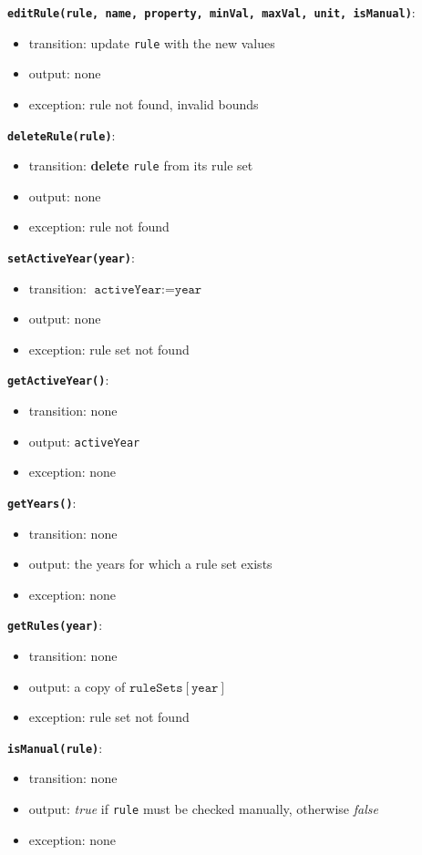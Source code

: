 \documentclass[12pt, titlepage]{article}
\begin{document}
\textbf{\texttt{editRule(rule, name, property, minVal, maxVal, unit, isManual)}}:
\begin{itemize}
  \item transition: update \texttt{rule} with the new values
  \item output: none
  \item exception: rule not found, invalid bounds
\end{itemize}

\textbf{\texttt{deleteRule(rule)}}:
\begin{itemize}
  \item transition: \textbf{delete} \texttt{rule} from its rule set
  \item output: none
  \item exception: rule not found
\end{itemize}

\textbf{\texttt{setActiveYear(year)}}:
\begin{itemize}
  \item transition: $\texttt{activeYear} := \texttt{year}$
  \item output: none
  \item exception: rule set not found
\end{itemize}

\textbf{\texttt{getActiveYear()}}:
\begin{itemize}
  \item transition: none
  \item output: \texttt{activeYear}
  \item exception: none
\end{itemize}

\textbf{\texttt{getYears()}}:
\begin{itemize}
  \item transition: none
  \item output: the years for which a rule set exists
  \item exception: none
\end{itemize}

\textbf{\texttt{getRules(year)}}:
\begin{itemize}
  \item transition: none
  \item output: a copy of $\texttt{ruleSets}[\texttt{year}]$
  \item exception: rule set not found
\end{itemize}

\textbf{\texttt{isManual(rule)}}:
\begin{itemize}
  \item transition: none
  \item output: \textit{true} if \texttt{rule} must be checked manually, otherwise \textit{false}
  \item exception: none
\end{itemize}
\end{document}
